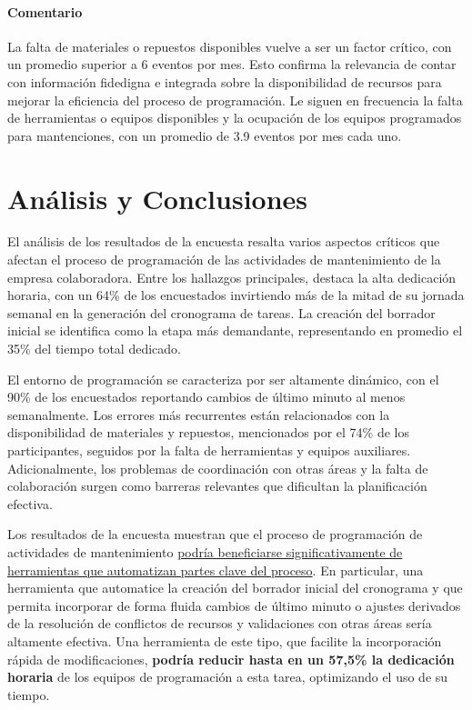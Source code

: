 \documentclass{article}
\begin{document}
\begin{appendix}
    \paragraph{Comentario}La falta de materiales o repuestos disponibles vuelve a ser un factor crítico, con un promedio superior a 6 eventos por mes. Esto confirma la relevancia de contar con información fidedigna e integrada sobre la disponibilidad de recursos para mejorar la eficiencia del proceso de programación. Le siguen en frecuencia la falta de herramientas o equipos disponibles y la ocupación de los equipos programados para mantenciones, con un promedio de 3.9 eventos por mes cada uno.
    
    \section*{Análisis y Conclusiones}
    
    El análisis de los resultados de la encuesta resalta varios aspectos críticos que afectan el proceso de programación de las actividades de mantenimiento de la empresa colaboradora. Entre los hallazgos principales, destaca la alta dedicación horaria, con un 64\% de los encuestados invirtiendo más de la mitad de su jornada semanal en la generación del cronograma de tareas. La creación del borrador inicial se identifica como la etapa más demandante, representando en promedio el 35\% del tiempo total dedicado.
    
    El entorno de programación se caracteriza por ser altamente dinámico, con el 90\% de los encuestados reportando cambios de último minuto al menos semanalmente. Los errores más recurrentes están relacionados con la disponibilidad de materiales y repuestos, mencionados por el 74\% de los participantes, seguidos por la falta de herramientas y equipos auxiliares. Adicionalmente, los problemas de coordinación con otras áreas y la falta de colaboración surgen como barreras relevantes que dificultan la planificación efectiva.
    
    Los resultados de la encuesta muestran que el proceso de programación de actividades de mantenimiento \uline{podría beneficiarse significativamente de herramientas que automatizan partes clave del proceso}. En particular, una herramienta que automatice la creación del borrador inicial del cronograma y que permita incorporar de forma fluida cambios de último minuto o ajustes derivados de la resolución de conflictos de recursos y validaciones con otras áreas sería altamente efectiva. Una herramienta de este tipo, que facilite la incorporación rápida de modificaciones, \textbf{podría reducir hasta en un 57,5\% la dedicación horaria} de los equipos de programación a esta tarea, optimizando el uso de su tiempo.
    

\end{appendix}
\end{document}
